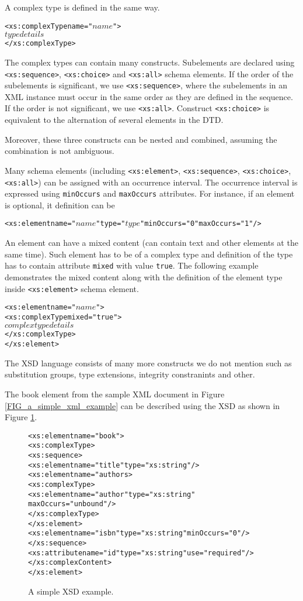 A complex type is defined in the same way.
\begin{alltt}
<xs:complexType name="\(name\)">
  \(type details\)
</xs:complexType>
\end{alltt}
The complex types can contain many constructs. Subelements are declared using \texttt{<xs:sequence>}, \texttt{<xs:choice>} and \texttt{<xs:all>} schema elements. If the order of the subelements is significant, we use \texttt{<xs:sequence>}, where the subelements in an XML instance must occur in the same order as they are defined in the sequence. If the order is not significant, we use \texttt{<xs:all>}. Construct \texttt{<xs:choice>} is equivalent to the alternation of several elements in the DTD.

Moreover, these three constructs can be nested and combined, assuming the combination is not ambiguous.

Many schema elements (including \texttt{<xs:element>}, \texttt{<xs:sequence>}, \texttt{<xs:choice>}, \texttt{<xs:all>}) can be assigned with an occurrence interval. The occurrence interval is expressed using \texttt{minOccurs} and \texttt{maxOccurs} attributes. For instance, if an element is optional, it definition can be
\begin{alltt}
<xs:element name="\(name\)" type="\(type\)" minOccurs="0" maxOccurs="1"/>
\end{alltt}

An element can have a mixed content (can contain text and other elements at the same time). Such element has to be of a complex type and definition of the type has to contain attribute \texttt{mixed} with value \texttt{true}. The following example demonstrates the mixed content along with the definition of the element type inside \texttt{<xs:element>} schema element.
\begin{alltt}
<xs:element name="\(name\)">
  <xs:complexType mixed="true">
    \(complex type details\)
  </xs:complexType>
</xs:element>
\end{alltt}

The XSD language consists of many more constructs we do not mention such as substitution groups, type extensions, integrity constranints and other.

The book element from the sample XML document in Figure \ref{FIG_a_simple_xml_example} can be described using the XSD as shown in Figure \ref{FIG_a_simple_xsd_example}.

\begin{figure}
\begin{alltt}
<xs:element name="book">
  <xs:complexType>
    <xs:sequence>
      <xs:element name="title" type="xs:string"/>
      <xs:element name="authors>
        <xs:complexType>
          <xs:element name="author" type="xs:string"
           maxOccurs="unbound"/>
        </xs:complexType>
      </xs:element>
      <xs:element name="isbn" type="xs:string" minOccurs="0"/>
    </xs:sequence>
    <xs:attribute name="id" type="xs:string" use="required"/>
  </xs:complexContent>
</xs:element>
\end{alltt}
\caption{A simple XSD example.}
\label{FIG_a_simple_xsd_example}
\end{figure}

